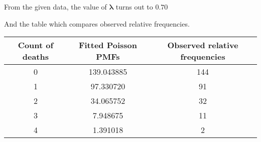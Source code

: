 \documentclass{article}
\begin{document}
From the given data, the value of $\mathbf{\lambda}$ turns out to $\mathbf{0.70}$
\bigskip

And the table which compares observed relative
frequencies.

\medskip
\begin{tabular}{*3c}\toprule
	\textbf{Count of deaths} & \textbf{Fitted Poisson PMFs} & \textbf{Observed relative frequencies}\\
	\midrule
	0 & 139.043885 & 144 \\
	1 & 97.330720 & 91 \\
	2 & 34.065752 & 32 \\
	3 & 7.948675 & 11 \\
	4 & 1.391018 & 2 \\
	\bottomrule
\end{tabular}
\end{document}
